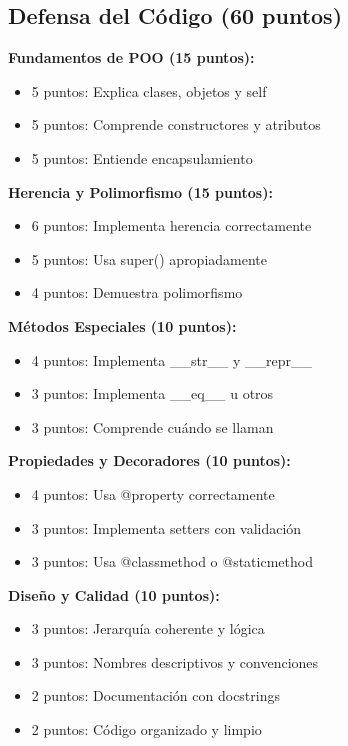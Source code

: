 \documentclass[11pt,letterpaper]{article}
\begin{document}
\subsection{Defensa del Código (60 puntos)}

\textbf{Fundamentos de POO (15 puntos):}
\begin{itemize}
    \item 5 puntos: Explica clases, objetos y self
    \item 5 puntos: Comprende constructores y atributos
    \item 5 puntos: Entiende encapsulamiento
\end{itemize}

\textbf{Herencia y Polimorfismo (15 puntos):}
\begin{itemize}
    \item 6 puntos: Implementa herencia correctamente
    \item 5 puntos: Usa super() apropiadamente
    \item 4 puntos: Demuestra polimorfismo
\end{itemize}

\textbf{Métodos Especiales (10 puntos):}
\begin{itemize}
    \item 4 puntos: Implementa \_\_str\_\_ y \_\_repr\_\_
    \item 3 puntos: Implementa \_\_eq\_\_ u otros
    \item 3 puntos: Comprende cuándo se llaman
\end{itemize}

\textbf{Propiedades y Decoradores (10 puntos):}
\begin{itemize}
    \item 4 puntos: Usa @property correctamente
    \item 3 puntos: Implementa setters con validación
    \item 3 puntos: Usa @classmethod o @staticmethod
\end{itemize}

\textbf{Diseño y Calidad (10 puntos):}
\begin{itemize}
    \item 3 puntos: Jerarquía coherente y lógica
    \item 3 puntos: Nombres descriptivos y convenciones
    \item 2 puntos: Documentación con docstrings
    \item 2 puntos: Código organizado y limpio
\end{itemize}
\end{document}
